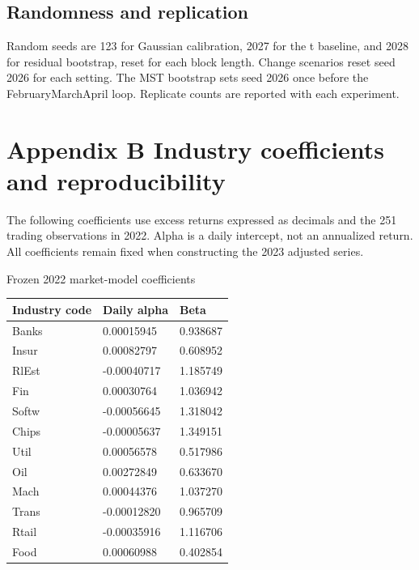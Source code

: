 \documentclass[11pt,a4paper]{article}
\newcommand{\reporttablefont}{\fontsize{9.4}{11.7}\selectfont}
\begin{document}
\subsection*{Randomness and replication}
Random seeds are 123 for Gaussian calibration, 2027 for the t baseline, and 2028 for residual bootstrap, reset for each block length. Change scenarios reset seed 2026 for each setting. The MST bootstrap sets seed 2026 once before the February\textendash{}March\textendash{}April loop. Replicate counts are reported with each experiment.

\clearpage
\setcounter{table}{0}
\section*{Appendix B  Industry coefficients and reproducibility}
The following coefficients use excess returns expressed as decimals and the 251 trading observations in 2022. Alpha is a daily intercept, not an annualized return. All coefficients remain fixed when constructing the 2023 adjusted series.

\begin{minipage}{\linewidth}\captionsetup{type=table}\caption{Frozen 2022 market-model coefficients}\reporttablefont\renewcommand{\arraystretch}{1.22}\begin{tabular}{@{}L{0.400000\dimexpr{}\tabcolsep\relax}C{0.300000\dimexpr{}\tabcolsep\relax}C{0.300000\dimexpr{}\tabcolsep\relax}@{}}\toprule
{\sffamily\bfseries\color{navy}Industry code} & {\sffamily\bfseries\color{navy}Daily alpha} & {\sffamily\bfseries\color{navy}Beta}\\\midrule
Banks & 0.00015945 & 0.938687\\
Insur & 0.00082797 & 0.608952\\
RlEst & -0.00040717 & 1.185749\\
Fin & 0.00030764 & 1.036942\\
Softw & -0.00056645 & 1.318042\\
Chips & -0.00005637 & 1.349151\\
Util & 0.00056578 & 0.517986\\
Oil & 0.00272849 & 0.633670\\
Mach & 0.00044376 & 1.037270\\
Trans & -0.00012820 & 0.965709\\
Rtail & -0.00035916 & 1.116706\\
Food & 0.00060988 & 0.402854\\
\bottomrule\end{tabular}\end{minipage}\par\vspace{5pt}
\end{document}
